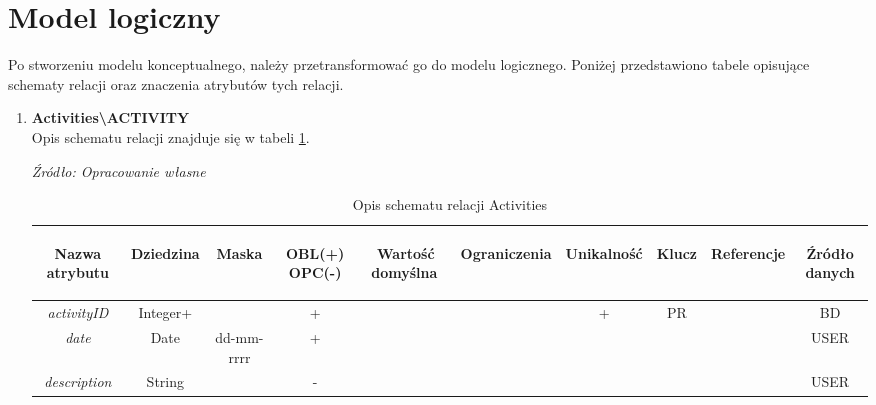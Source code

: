 \documentclass[12pt,twoside]{report}
\begin{document}
\section{Model logiczny}
Po stworzeniu modelu konceptualnego, należy przetransformować go do modelu logicznego. Poniżej przedstawiono tabele opisujące schematy relacji oraz znaczenia atrybutów tych relacji.
\begin{enumerate}[start=1,label={\bfseries REL\textbackslash0\arabic*}]
	\item \textbf{Activities\textbackslash ACTIVITY} \\
	Opis schematu relacji znajduje się w tabeli \ref{ActivityRelationSchema}.
	
	\begin{table}[H]
		\caption{Opis schematu relacji Activities}
		\textit{Źródło: Opracowanie własne}
		\label{ActivityRelationSchema}
		\centering
		\begin{tabular}{|c|c|c|c|c|c|c|c|c|c|}
			\hline
			\begin{sideways}Nazwa atrybutu\end{sideways}& 
			\begin{sideways}Dziedzina \end{sideways}& 
			\begin{sideways}Maska \end{sideways}& 
			\begin{sideways}OBL(+) OPC(-)\end{sideways} & 
			\begin{sideways}Wartość domyślna$\ $\end{sideways}& 
			\begin{sideways}Ograniczenia\end{sideways} &
			\begin{sideways}Unikalność \end{sideways}& 
			\begin{sideways}Klucz \end{sideways}& 
			\begin{sideways}Referencje \end{sideways}&
			\begin{sideways}Źródło danych\end{sideways}\\
			\hline
			\textit{activityID} & Integer+ & & + & & & + & PR & &BD\\
			\hline
			\textit{date} & Date & dd-mm-rrrr& + & & & & & &USER\\
			\hline
			\textit{description} & String & & - & & & & & &USER\\

\end{tabular}
\end{table}
\end{enumerate}
\end{document}
